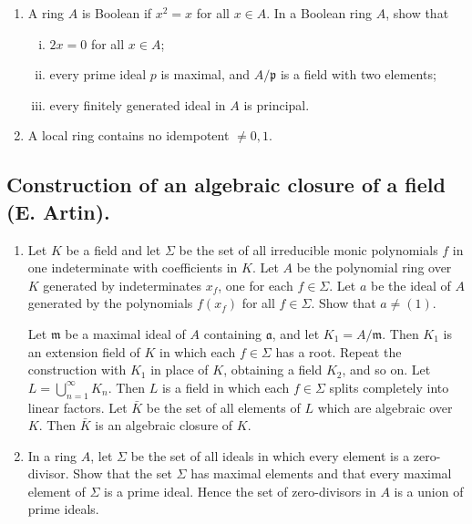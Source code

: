 \documentclass[class=book, crop=false]{standalone}
\theoremstyle{definition}
\theoremstyle{remark}
\begin{document}
\begin{enumerate}[series=exc1]
  \item A ring $A$ is Boolean if $x^{2}=x$ for all $x \in A$. In a Boolean ring
  $A$, show that
  \begin{enumerate}[i)]
    \item $2 x=0$ for all $x \in A$;
    \item every prime ideal $p$ is maximal, and $A / \mathfrak{p}$ is a field with two
elements;
    \item every finitely generated ideal in $A$ is principal.
  \end{enumerate}
  \item A local ring contains no idempotent $\neq 0,1$.
\end{enumerate}

\subsection*{Construction of an algebraic closure of a field (E. Artin).}

\begin{enumerate}[resume*=exc1]
  \item Let $K$ be a field and let $\Sigma$ be the set of all irreducible monic
        polynomials $f$ in one indeterminate with coefficients in $K$. Let $A$
        be the polynomial ring over $K$ generated by indeterminates $x_{f}$, one
        for each $f \in \Sigma$. Let $a$ be the ideal of $A$ generated by the
        polynomials $f\left(x_{f}\right)$ for all $f \in \Sigma$. Show that
        $a \neq(1)$.

Let $\mathfrak{m}$ be a maximal ideal of $A$ containing $\mathfrak{a}$, and let
$K_{1}=A / \mathfrak{m}$. Then $K_{1}$ is an extension field of $K$ in which
each $f \in \Sigma$ has a root. Repeat the construction with $K_{1}$ in place of
$K$, obtaining a field $K_{2}$, and so on. Let $L=\bigcup_{n=1}^{\infty} K_{n}$.
Then $L$ is a field in which each $f \in \Sigma$ splits completely into linear
factors. Let $\bar{K}$ be the set of all elements of $L$ which are algebraic over $K$.
Then $\bar{K}$ is an algebraic closure of $K$.

  \item In a ring $A$, let $\Sigma$ be the set of all ideals in which every
        element is a zero-divisor. Show that the set $\Sigma$ has maximal
        elements and that every maximal element of $\Sigma$ is a prime ideal.
        Hence the set of zero-divisors in $A$ is a union of prime ideals.
\end{enumerate}
\end{document}

